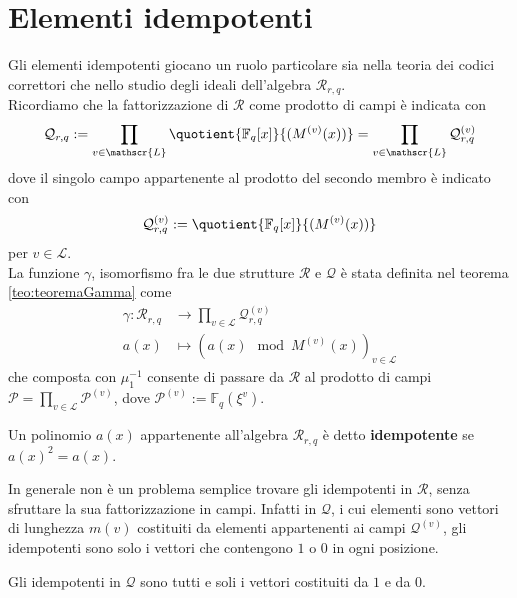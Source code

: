 \section{Elementi idempotenti}

Gli elementi idempotenti giocano un ruolo particolare sia nella teoria dei codici correttori che nello studio degli ideali dell'algebra $\mathcal{R}_{r,q}$. \\
Ricordiamo che la fattorizzazione di $\mathcal{R}$ come prodotto di campi è indicata con
\begin{align*}
    \mathcal{Q}_{r,q}
    :=
    \prod_{v\in \mathscr{L}} \quotient{\mathbb{F}_{q} \lbrack x \rbrack  }{(M^{(v)}(x))}
    =
    \prod_{v\in \mathscr{L}} \mathcal{Q}_{r,q}^{(v)}
\end{align*}
dove il singolo campo appartenente al prodotto del secondo membro è indicato con
\begin{align*}
    \mathcal{Q}_{r,q}^{(v)}
    :=
    \quotient{\mathbb{F}_{q} \lbrack x \rbrack  }{(M^{(v)}(x))}
\end{align*}
per $v\in \mathscr{L}$.\\
La funzione $\gamma$, isomorfismo fra le due strutture $\mathcal{R}$ e $\mathcal{Q}$ è stata definita nel teorema \ref{teo:teoremaGamma} come
\begin{align*}
\gamma :  \mathcal{R}_{r,q}  & \longrightarrow  \prod_{v\in \mathscr{L}} \mathcal{Q}_{r,q}^{(v)}   \\
                        a(x) &\longmapsto (a(x)\mod{M^{(v)}(x)})_{v\in \mathscr{L}}
\end{align*}
che composta con $\mu_{1}^{-1}$ consente di passare da $\mathcal{R}$ al prodotto di campi $\mathcal{P} = \prod_{v\in \mathscr{L}} \mathcal{P}^{(v)}$, dove $\mathcal{P}^{(v)} := \mathbb{F}_{q}(\xi^{v})$.
\begin{definizione}
   Un polinomio $a(x)$ appartenente all'algebra $\mathcal{R}_{r,q}$ è detto {\bf idempotente} se $a(x)^2 = a(x)$.
\end{definizione}
\noindent
In generale non è un problema semplice trovare gli idempotenti in $\mathcal{R}$, senza sfruttare la sua fattorizzazione in campi. Infatti in $\mathcal{Q}$, i cui elementi sono vettori di lunghezza $m(v)$ costituiti da elementi appartenenti ai campi $\mathcal{Q}^{(v)}$, gli idempotenti sono solo i vettori che contengono $1$ o $0$ in ogni posizione.
\begin{prop}
   Gli idempotenti in $\mathcal{Q}$ sono tutti e soli i vettori costituiti da $1$ e da $0$.
\end{prop}
